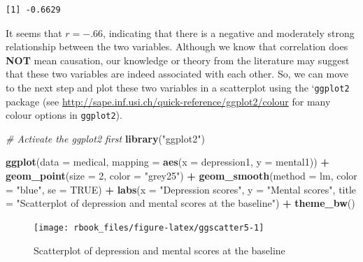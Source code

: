 \documentclass[]{book}
\newenvironment{Shaded}{\begin{snugshade}}{\end{snugshade}}
\newcommand{\CommentTok}[1]{\textcolor[rgb]{0.56,0.35,0.01}{\textit{#1}}}
\newcommand{\DataTypeTok}[1]{\textcolor[rgb]{0.13,0.29,0.53}{#1}}
\newcommand{\DecValTok}[1]{\textcolor[rgb]{0.00,0.00,0.81}{#1}}
\newcommand{\KeywordTok}[1]{\textcolor[rgb]{0.13,0.29,0.53}{\textbf{#1}}}
\newcommand{\NormalTok}[1]{#1}
\newcommand{\OperatorTok}[1]{\textcolor[rgb]{0.81,0.36,0.00}{\textbf{#1}}}
\newcommand{\OtherTok}[1]{\textcolor[rgb]{0.56,0.35,0.01}{#1}}
\newcommand{\StringTok}[1]{\textcolor[rgb]{0.31,0.60,0.02}{#1}}
\begin{document}
\begin{Shaded}
\end{Shaded}

\begin{verbatim}
[1] -0.6629
\end{verbatim}

It seems that \(r = -.66\), indicating that there is a negative and moderately strong relationship between the two variables. Although we know that correlation does \textbf{NOT} mean causation, our knowledge or theory from the literature may suggest that these two variables are indeed associated with each other. So, we can move to the next step and plot these two variables in a scatterplot using the `\texttt{ggplot2} package (see \url{http://sape.inf.usi.ch/quick-reference/ggplot2/colour} for many colour options in \texttt{ggplot2}).

\begin{Shaded}
\begin{Highlighting}[]
\CommentTok{# Activate the ggplot2 first}
\KeywordTok{library}\NormalTok{(}\StringTok{"ggplot2"}\NormalTok{)}

\KeywordTok{ggplot}\NormalTok{(}\DataTypeTok{data =}\NormalTok{ medical, }
       \DataTypeTok{mapping =} \KeywordTok{aes}\NormalTok{(}\DataTypeTok{x =}\NormalTok{ depression1, }\DataTypeTok{y =}\NormalTok{ mental1)) }\OperatorTok{+}\StringTok{ }
\StringTok{  }\KeywordTok{geom_point}\NormalTok{(}\DataTypeTok{size =} \DecValTok{2}\NormalTok{, }\DataTypeTok{color =} \StringTok{"grey25"}\NormalTok{) }\OperatorTok{+}
\StringTok{  }\KeywordTok{geom_smooth}\NormalTok{(}\DataTypeTok{method =}\NormalTok{ lm, }\DataTypeTok{color =} \StringTok{"blue"}\NormalTok{, }\DataTypeTok{se =} \OtherTok{TRUE}\NormalTok{) }\OperatorTok{+}
\StringTok{  }\KeywordTok{labs}\NormalTok{(}\DataTypeTok{x =} \StringTok{"Depression scores"}\NormalTok{, }
       \DataTypeTok{y =} \StringTok{"Mental scores"}\NormalTok{,}
       \DataTypeTok{title =} \StringTok{"Scatterplot of depression and mental scores at the baseline"}\NormalTok{) }\OperatorTok{+}
\StringTok{  }\KeywordTok{theme_bw}\NormalTok{()}
\end{Highlighting}
\end{Shaded}

\begin{figure}

{\centering \texttt{[image: rbook\_files/figure-latex/ggscatter5-1]} 

}

\caption{Scatterplot of depression and mental scores at the baseline}\label{fig:ggscatter5}
\end{figure}
\end{document}
